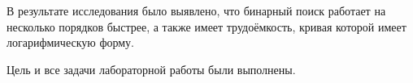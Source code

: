
В результате исследования было выявлено, что бинарный поиск работает на несколько порядков быстрее, а также  имеет трудоёмкость, кривая которой имеет логарифмическую форму.

Цель и все задачи лабораторной работы были выполнены.